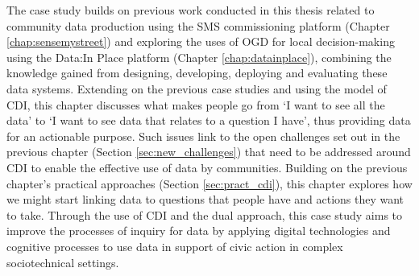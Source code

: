 The case study builds on previous work conducted in this thesis related to community data production using the SMS commissioning platform (Chapter \ref{chap:sensemystreet}) and exploring the uses of OGD for local decision-making using the Data:In Place platform (Chapter \ref{chap:datainplace}), combining the knowledge gained from designing, developing, deploying and evaluating these data systems. Extending on the previous case studies and using the model of CDI, this chapter discusses what makes people go from `I want to see all the data' to `I want to see data that relates to a question I have', thus providing data for an actionable purpose. Such issues link to the open challenges set out in the previous chapter (Section \ref{sec:new_challenges}) that need to be addressed around CDI to enable the effective use of data by communities. Building on the previous chapter's practical approaches (Section \ref{sec:pract_cdi}), this chapter explores how we might start linking data to questions that people have and actions they want to take. Through the use of CDI and the dual approach, this case study aims to improve the processes of inquiry for data by applying digital technologies and cognitive processes to use data in support of civic action in complex sociotechnical settings.

